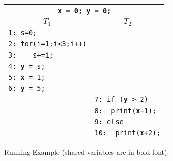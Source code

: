 

%



\begin{figure}
\centering
\begin{tabular}{ll}
\multicolumn{2}{c}{{\tt {\bf x} = 0; {\bf y} = 0;}} \\
\hline
\multicolumn{1}{c}{$T_1$} & \multicolumn{1}{c}{$T_2$} \\
\hline
{\tt 1: s=0; } & \\
{\tt 2: for(i=1;i<3;i++)} & \\
{\tt 3: \ \ \ s+=i;} & \\
{\tt 4: {\bf y} = s;} & \\
{\tt 5: {\bf x} = 1;} & \\
{\tt 6: {\bf y} = 5;} & \\
& {\tt 7: if ({\bf y} > 2)} \\
& {\tt 8:~~print({\bf x}+1);} \\	
& {\color{Gray} {\tt 9: else}} \\
& {\color{Gray} {\tt 10:~~print({\bf x}+2);}}
\end{tabular}
\caption{Running Example (shared variables are in bold font). }
\label{fig:running2}
\end{figure}

